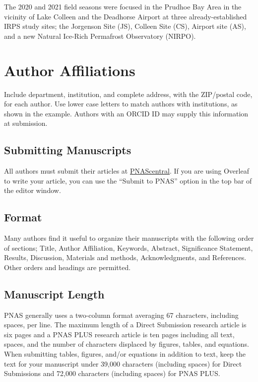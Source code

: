 \documentclass[9pt,twocolumn,twoside,]{pnas-new}
\begin{document}
The 2020 and 2021 field seasons were focused in the Prudhoe Bay Area in
the vicinity of Lake Colleen and the Deadhorse Airport at three
already-established IRPS study sites; the Jorgenson Site (JS), Colleen
Site (CS), Airport site (AS), and a new Natural Ice-Rich Permafrost
Observatory (NIRPO).

\hypertarget{author-affiliations}{%
\section{Author Affiliations}\label{author-affiliations}}

Include department, institution, and complete address, with the
ZIP/postal code, for each author. Use lower case letters to match
authors with institutions, as shown in the example. Authors with an
ORCID ID may supply this information at submission.

\hypertarget{submitting-manuscripts}{%
\subsection{Submitting Manuscripts}\label{submitting-manuscripts}}

All authors must submit their articles at
\href{http://www.pnascentral.org/cgi-bin/main.plex}{PNAScentral}. If you
are using Overleaf to write your article, you can use the ``Submit to
PNAS'' option in the top bar of the editor window.

\hypertarget{format}{%
\subsection*{Format}\label{format}}

Many authors find it useful to organize their manuscripts with the
following order of sections; Title, Author Affiliation, Keywords,
Abstract, Significance Statement, Results, Discussion, Materials and
methods, Acknowledgments, and References. Other orders and headings are
permitted.

\hypertarget{manuscript-length}{%
\subsection{Manuscript Length}\label{manuscript-length}}

PNAS generally uses a two-column format averaging 67 characters,
including spaces, per line. The maximum length of a Direct Submission
research article is six pages and a PNAS PLUS research article is ten
pages including all text, spaces, and the number of characters displaced
by figures, tables, and equations. When submitting tables, figures,
and/or equations in addition to text, keep the text for your manuscript
under 39,000 characters (including spaces) for Direct Submissions and
72,000 characters (including spaces) for PNAS PLUS.
\end{document}
